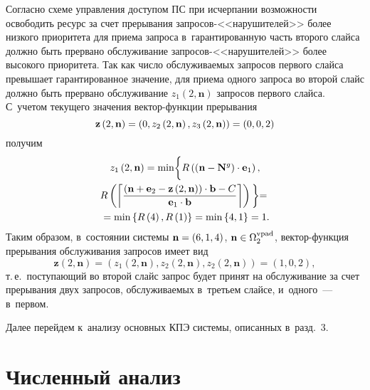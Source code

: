 \begin{multicols}{2}
Согласно схеме управления доступом ПС при исчерпании возможности освободить 
ресурс за счет прерывания запросов-<<нарушителей>> более низкого приоритета для 
приема запроса в~гарантированную часть второго слайса должно быть прервано 
обслуживание за\-про\-сов-<<на\-ру\-ши\-те\-лей>> более высокого приоритета. Так как число 
об\-слу\-жи\-ва\-емых запросов первого слайса превышает гарантированное значение, для 
приема одного запроса во второй слайс должно быть прервано обслуживание 
$z_1\left(2,\mathbf{n}\right)$ запросов первого слайса. С~учетом текущего 
значения век\-тор-функ\-ции прерывания 
$$
\mathbf{z}\left(2,\mathbf{n}\right)=\left(0, 
z_2\left(2,\mathbf{n}\right), 
z_3\left(2,\mathbf{n}\right)\right)\hm=\left(0,0,2\right)
$$ 
получим
\begin{multline*}
z_1\left(2,\mathbf{n}\right) = \min
\biggl\{
R \left(\left(\mathbf{n}-\mathbf{N}^{{g}}\right) \cdot \mathbf{e}_1\right), 
\\
R \left(\left\lceil \displaystyle\frac{\displaystyle \left(\mathbf{n}+\mathbf{e}_2 - 
\mathbf{z}\left(2,\mathbf{n}\right) \right)\cdot\mathbf{b} - 
C\mathstrut}{\displaystyle \mathbf{e}_1\cdot\mathbf{b}\mathstrut} \right\rceil\right)
\biggl\} ={} \\
{}= \min \left\{R \left(4\right),R \left(1\right) \right\} = \min 
\left\{4,1\right\} = 1.
\end{multline*}
Таким образом, в~состоянии системы $\mathbf{n}\hm=\left(6,1,4\right)$, 
$\mathbf{n}\hm\in\Omega_2^{\mathrm{vpad}}$, век\-тор-функ\-ция прерывания обслуживания 
запросов имеет вид 
$$
\mathbf{z}\left(2,\mathbf{n}\right)=\left(z_1\left(2,\mathbf{n}\right), 
z_2\left(2,\mathbf{n}\right), 
z_2\left(2,\mathbf{n}\right)\right)=\left(1,0,2\right),
$$
 т.\,е.\ поступающий во 
второй слайс запрос будет принят на обслуживание за счет прерывания двух 
запросов, об\-слу\-жи\-ва\-емых в~третьем слайсе, и~одного~--- в~первом.

Далее перейдем к~анализу основных КПЭ сис\-те\-мы, описанных в~разд.~3.



\section{Численный анализ}


\end{multicols}
